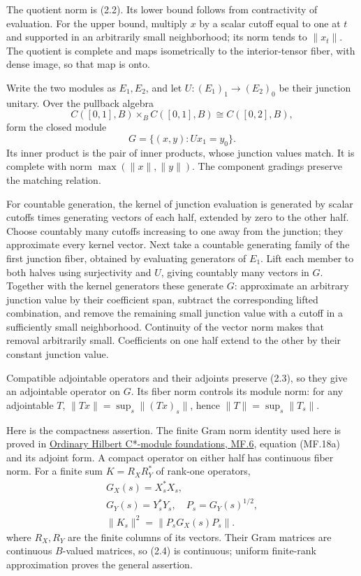 \documentclass[
  11pt,
]{article}
\begin{document}
The quotient norm is (2.2). Its lower bound follows from contractivity
of evaluation. For the upper bound, multiply \(x\) by a scalar cutoff
equal to one at \(t\) and supported in an arbitrarily small
neighborhood; its norm tends to \(\|x_t\|\). The quotient is complete
and maps isometrically to the interior-tensor fiber, with dense image,
so that map is onto.

Write the two modules as \(E_1,E_2\), and let \(U:(E_1)_1\to(E_2)_0\) be
their junction unitary. Over the pullback algebra \[
C([0,1],B)\mathbin{\times_B}C([0,1],B)
\cong C([0,2],B),
\] form the closed module \[
G=\{(x,y):Ux_1=y_0\}.
\tag{2.3}
\] Its inner product is the pair of inner products, whose junction
values match. It is complete with norm \(\max(\|x\|,\|y\|)\). The
component gradings preserve the matching relation.

For countable generation, the kernel of junction evaluation is generated
by scalar cutoffs times generating vectors of each half, extended by
zero to the other half. Choose countably many cutoffs increasing to one
away from the junction; they approximate every kernel vector. Next take
a countable generating family of the first junction fiber, obtained by
evaluating generators of \(E_1\). Lift each member to both halves using
surjectivity and \(U\), giving countably many vectors in \(G\). Together
with the kernel generators these generate \(G\): approximate an
arbitrary junction value by their coefficient span, subtract the
corresponding lifted combination, and remove the remaining small
junction value with a cutoff in a sufficiently small neighborhood.
Continuity of the vector norm makes that removal arbitrarily small.
Coefficients on one half extend to the other by their constant junction
value.

Compatible adjointable operators and their adjoints preserve (2.3), so
they give an adjointable operator on \(G\). Its fiber norm controls its
module norm: for any adjointable \(T\), \(\|Tx\|=\sup_s\|(Tx)_s\|\),
hence \(\|T\|=\sup_s\|T_s\|\).

Here is the compactness assertion. The finite Gram norm identity used
here is proved in
\href{supporting/hilbert-c-star-modules-and-morita-equivalence/hilbert-module-foundations.html\#mf-006}{Ordinary
Hilbert C*-module foundations, MF.6}, equation (MF.18a) and its adjoint
form. A compact operator on either half has continuous fiber norm. For a
finite sum \(K=R_XR_Y^*\) of rank-one operators, \[
\begin{gathered}
G_X(s)=X_s^*X_s,\\
G_Y(s)=Y_s^*Y_s,\quad P_s=G_Y(s)^{1/2},\\
\|K_s\|^2=\|P_sG_X(s)P_s\|.
\end{gathered}
\tag{2.4}
\] where \(R_X,R_Y\) are the finite columns of its vectors. Their Gram
matrices are continuous \(B\)-valued matrices, so (2.4) is continuous;
uniform finite-rank approximation proves the general assertion.
\end{document}
